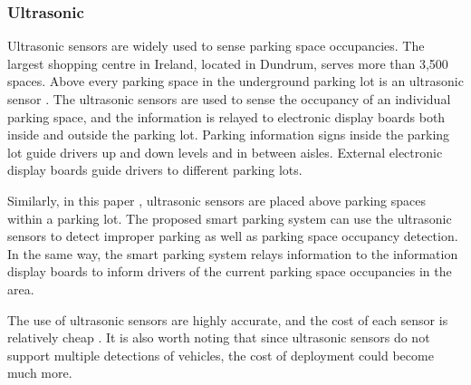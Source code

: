 \subsubsection*{Ultrasonic}
Ultrasonic sensors are widely used to sense parking space occupancies. The largest shopping centre in Ireland, located in Dundrum, serves more than 3,500 spaces. Above every parking space in the underground parking lot is an ultrasonic sensor \citep{Gavin2008Bay-SpecificCentre}. The ultrasonic sensors are used to sense the occupancy of an individual parking space, and the information is relayed to electronic display boards both inside and outside the parking lot. Parking information signs inside the parking lot guide drivers up and down levels and in between aisles. External electronic display boards guide drivers to different parking lots.

Similarly, in this paper \citep{Kianpisheh2012SmartDetector}, ultrasonic sensors are placed above parking spaces within a parking lot. The proposed smart parking system can use the ultrasonic sensors to detect improper parking as well as parking space occupancy detection. In the same way, the smart parking system relays information to the information display boards to inform drivers of the current parking space occupancies in the area.

The use of ultrasonic sensors are highly accurate, and the cost of each sensor is relatively cheap \citep{dokur_embedded_2016}. It is also worth noting that since ultrasonic sensors do not support multiple detections of vehicles, the cost of deployment could become much more.